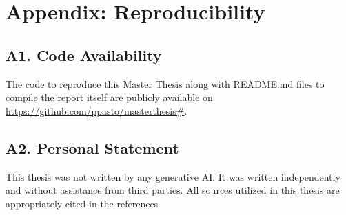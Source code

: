 





\chapter*{Appendix: Reproducibility} \label{appndx}
% 
% 
%  
% 
% 
\section*{A1. Code Availability}

The code to reproduce this Master Thesis along with README.md files to compile the report itself are publicly available on \url{https://github.com/ppasto/masterthesis#}. 



\section*{A2. Personal Statement}

This thesis was not written by any generative AI. It was written independently and
without assistance from third parties. All sources utilized in this thesis are appropriately cited in the references

